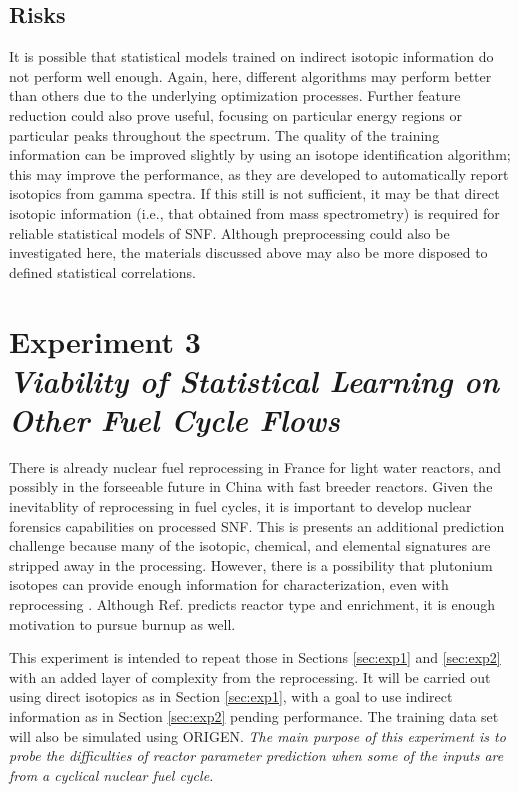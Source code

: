 \subsection*{Risks}

It is possible that statistical models trained on indirect isotopic information
do not perform well enough. Again, here, different algorithms may perform
better than others due to the underlying optimization processes. Further
feature reduction could also prove useful, focusing on particular energy
regions or particular peaks throughout the spectrum. The quality of the
training information can be improved slightly by using an isotope
identification algorithm; this may improve the performance, as they are
developed to automatically report isotopics from gamma spectra. If this still
is not sufficient, it may be that direct isotopic information (i.e., that
obtained from mass spectrometry) is required for reliable statistical models of
\gls{SNF}.  Although preprocessing could also be investigated here, the
materials discussed above may also be more disposed to defined statistical
correlations.

\section[Experiment 3: Other Fuel Cycle Flows]{Experiment 3\\ 
\large{\textit{Viability of Statistical Learning on Other Fuel Cycle Flows}}}
\label{sec:exp3}

There is already nuclear fuel reprocessing in France for light water reactors,
and possibly in the forseeable future in China with fast breeder reactors.
Given the inevitablity of reprocessing in fuel cycles, it is important to
develop nuclear forensics capabilities on processed \gls{SNF}. This is presents
an additional prediction challenge because many of the isotopic, chemical, and
elemental signatures are stripped away in the processing. However, there is a
possibility that plutonium isotopes can provide enough information for
characterization, even with reprocessing \cite{pu_discrimination}. Although
Ref. \cite{pu_discrimination} predicts reactor type and enrichment, it is
enough motivation to pursue burnup as well. 

This experiment is intended to repeat those in Sections \ref{sec:exp1} and
\ref{sec:exp2} with an added layer of complexity from the reprocessing.  It
will be carried out using direct isotopics as in Section \ref{sec:exp1}, with a
goal to use indirect information as in Section \ref{sec:exp2} pending
performance. The training data set will also be simulated using \gls{ORIGEN}.
\textit{The main purpose of this experiment is to probe the difficulties of
reactor parameter prediction when some of the inputs are from a cyclical
nuclear fuel cycle.}

